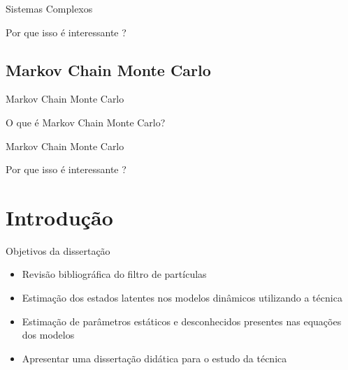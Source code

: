 \documentclass{beamer}
\begin{document}
\begin{frame}{Sistemas Complexos}

Por que isso é interessante ?

\end{frame}



\subsection{Markov Chain Monte Carlo}

\begin{frame}{Markov Chain Monte Carlo}

O que é Markov Chain Monte Carlo?

\end{frame}


\begin{frame}{Markov Chain Monte Carlo}

Por que isso é interessante ?

\end{frame}




\section{Introdução}
\begin{frame}{Objetivos da dissertação}
\noindent
  \begin{itemize}
  \item<1->  Revisão bibliográfica do filtro de partículas
  \item<2->  Estimação dos estados latentes nos modelos dinâmicos utilizando a técnica
  \item<3->  Estimação de parâmetros estáticos e desconhecidos presentes nas equações dos modelos
  \item<4->  Apresentar uma dissertação didática para o estudo da técnica 
  \end{itemize}
\end{frame}
\end{document}
